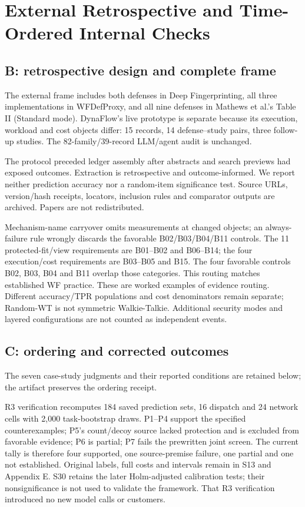 \section{External Retrospective and Time-Ordered Internal Checks}\label{sec:r28-details}
\subsection{B: retrospective design and complete frame}
The external frame includes both defenses in Deep Fingerprinting, all three implementations in WFDefProxy, and all nine defenses in Mathews et al.'s Table II (Standard mode). DynaFlow's live prototype is separate because its execution, workload and cost objects differ: 15 records, 14 defense--study pairs, three follow-up studies. The 82-family/39-record LLM/agent audit is unchanged.

The protocol preceded ledger assembly after abstracts and search previews had exposed outcomes. Extraction is retrospective and outcome-informed. We report neither prediction accuracy nor a random-item significance test. Source URLs, version/hash receipts, locators, inclusion rules and comparator outputs are archived. Papers are not redistributed.

Mechanism-name carryover omits measurements at changed objects; an always-failure rule wrongly discards the favorable B02/B03/B04/B11 controls. The 11 protected-fit/view requirements are B01--B02 and B06--B14; the four execution/cost requirements are B03--B05 and B15. The four favorable controls B02, B03, B04 and B11 overlap those categories. This routing matches established WF practice. These are worked examples of evidence routing. Different accuracy/TPR populations and cost denominators remain separate; Random-WT is not symmetric Walkie-Talkie. Additional security modes and layered configurations are not counted as independent events.

\subsection{C: ordering and corrected outcomes}
The seven case-study judgments and their reported conditions are retained below; the artifact preserves the ordering receipt.

R3 verification recomputes 184 saved prediction sets, 16 dispatch and 24 network cells with 2,000 task-bootstrap draws. P1--P4 support the specified counterexamples; P5's count/decoy source lacked protection and is excluded from favorable evidence; P6 is partial; P7 fails the prewritten joint screen. The current tally is therefore four supported, one source-premise failure, one partial and one not established. Original labels, full costs and intervals remain in S13 and Appendix E. S30 retains the later Holm-adjusted calibration tests; their nonsignificance is not used to validate the framework. That R3 verification introduced no new model calls or customers.


